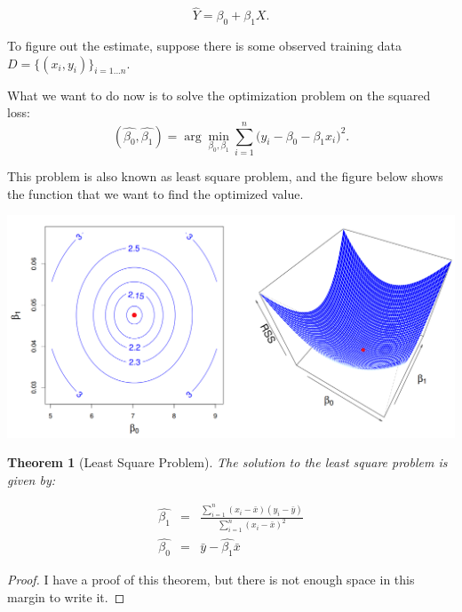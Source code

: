 \documentclass{article}
\theoremstyle{MyNonumberplain}
\theoremstyle{break}
\newtheorem*{proof}{Proof. }
\newcommand{\bt}[1]{\beta_{#1}}
\newcommand\ddfrac[2]{\frac{\displaystyle #1}{\displaystyle #2}}
\theoremstyle{break}
\newtheorem{theorem}{Theorem}[section]
\theoremstyle{break}
\theoremstyle{break}
\begin{document}
$$\hat{Y}=\bt{0}+\bt{1}X.$$

To figure out the estimate, suppose there is some observed training data $D=\biggl\{(x_i,y_i)\biggr\}_{i=1...n}$.

What we want to do now is to solve the optimization problem on the squared loss:
$$(\hat{\bt{0}},\hat{\bt{1}})=\arg\min_{\bt{0},\bt{1}}\sum_{i=1}^n\bigl(y_i-\bt{0}-\bt{1}x_i\bigr)^2.$$

This problem is also known as least square problem, and the figure below shows the function that we want to find the optimized value.

\begin{center}
    \includegraphics*[scale=0.25]{Images/img7.png}
\end{center}

\begin{thmbox}
    \begin{theorem}[Least Square Problem]
        The solution to the least square problem is given by: 
    \end{theorem}
        \begin{eqnarray*}
            \hat{\bt{1}}&=& \ddfrac{\sum_{i=1}^n(x_i-\bar{x})(y_i-\bar{y})}{\sum_{i=1}^n(x_i-\bar{x})^2}\\
            \hat{\bt{0}}&=& \bar{y}- \hat{\bt{1}}\bar{x}
        \end{eqnarray*}
        \begin{prfbox}
            \begin{proof}
                I have a proof of this theorem, but there is not enough space in this margin to write it. 
            \end{proof}
        \end{prfbox}
\end{thmbox}
\end{document}
